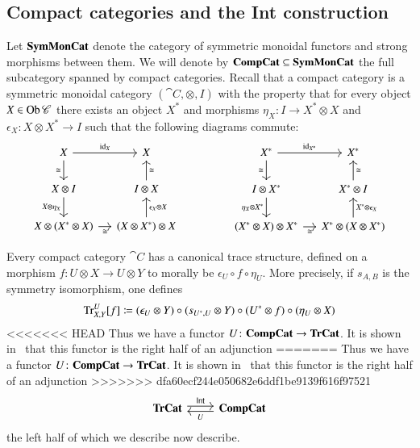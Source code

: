 \documentclass[12pt,oneside,article,draft]{memoir}
\begin{document}
\begin{enumerate}
{}%

\section{Compact categories and the Int construction}\label{sec:compact and int}

Let $\mathbf{SymMonCat}$ denote the category of symmetric monoidal functors and strong morphisms between them.
We will denote by $\mathbf{CompCat}\subseteq\mathbf{SymMonCat}$ the full subcategory spanned by compact categories.
Recall that a compact category is a symmetric monoidal category $(\cat{C},\otimes,I)$ with the property that for every object $X\in\operatorname{Ob}\mathscr{C}$ there exists an object $X^*$ and morphisms $\eta_X\colon I\to X^*\otimes X$ and $\epsilon_X\colon X\otimes X^*\to I$ such that the following diagrams commute:
$$
	\begin{tikzcd}[column sep=small]
		X\arrow[r,"\id_X"]\arrow[d,"\cong"'] & X \\
		X\otimes I\arrow[d,"X\otimes\eta_X"'] & I\otimes X\arrow[u,"\cong"'] \\
		X\otimes(X^*\otimes X)\arrow[r,"\cong"'] & (X\otimes X^*)\otimes X\arrow[u,"\epsilon_X\otimes X"']
	\end{tikzcd}
	\hspace{.6in}
	\begin{tikzcd}[column sep=small]
		X^*\arrow[r,"\id_{X^*}"]\arrow[d,"\cong"'] & X^*\\
		I\otimes X^*\arrow[d,"\eta_X\otimes X^*"'] & X^*\otimes I\arrow[u,"\cong"'] \\
		(X^*\otimes X)\otimes X^*\arrow[r,"\cong"'] & X^*\otimes (X\otimes X^*)\arrow[u,"X^*\otimes\epsilon_X"']
	\end{tikzcd}
$$

Every compact category $\cat{C}$ has a canonical trace structure, defined on a morphism $f\colon U\otimes X\to U\otimes Y$ to morally be $\epsilon_U\circ f\circ \eta_U$.
More precisely, if $s_{A,B}$ is the symmetry isomorphism, one defines
	$$\operatorname{Tr}^U_{X,Y}[f]\coloneqq(\epsilon_U\otimes Y)\circ (s_{U^*,U}\otimes Y)\circ (U^*\otimes f)\circ (\eta_U\otimes X)$$
<<<<<<< HEAD
Thus we have a functor $U\colon\mathbf{CompCat}\to\mathbf{TrCat}$.
It is shown in~\cite{Joyal-Street-Verity} that this functor is the right half of an adjunction 
=======
Thus we have a functor 
$U\colon\mathbf{CompCat}\to\mathbf{TrCat}$. It is shown in~\cite{JoyalStreetVerity} that this functor is the right half of an adjunction
>>>>>>> dfa60ecf244e050682e6ddf1be9139f616f97521
\begin{equation}\label{dia:traced compact adjunction}
\begin{tikzcd}
	\TrCat\arrow[r,shift left=.5ex, "\Int"]&\CompCat\arrow[l,shift left=.5ex,"U"]
\end{tikzcd}
\end{equation}
the left half of which we describe now describe. 


\end{enumerate}
\end{document}
